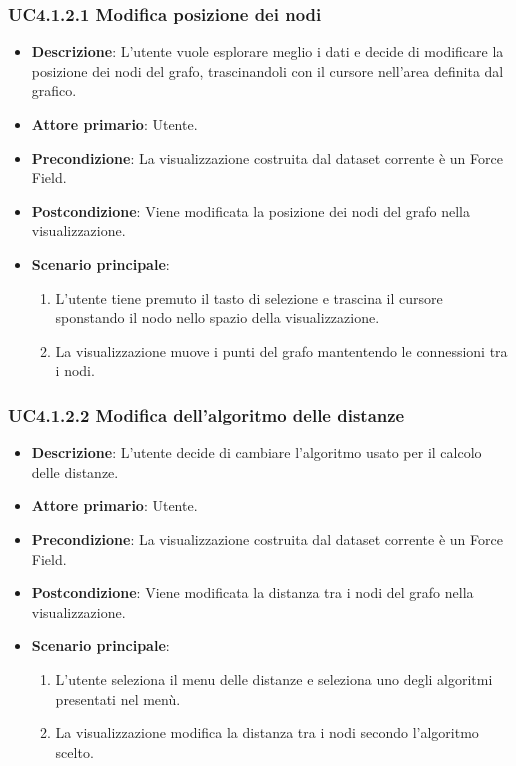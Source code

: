 \subsubsection{UC4.1.2.1 Modifica posizione dei nodi}
\label{subsec:uc4.1.2.1}
\begin{itemize}
    \item \textbf{Descrizione}: L’utente vuole esplorare meglio i dati e decide di 
                                modificare la posizione dei nodi del grafo, trascinandoli con il 
                                cursore nell'area definita dal grafico.
	
    \item \textbf{Attore primario}: Utente.
    
    \item \textbf{Precondizione}:   La visualizzazione costruita dal dataset corrente è un Force Field.
    \item \textbf{Postcondizione}:  Viene modificata la posizione dei nodi del grafo nella visualizzazione.

	\item \textbf{Scenario principale}:
        \begin{enumerate}
            \item L'utente tiene premuto il tasto di selezione e trascina il cursore sponstando il nodo nello spazio della visualizzazione.
            \item La visualizzazione muove i punti del grafo mantentendo le connessioni tra i nodi.
        \end{enumerate}
\end{itemize}

\subsubsection{UC4.1.2.2 Modifica dell'algoritmo delle distanze}
\label{subsec:uc4.1.2.2}
\begin{itemize}
    \item \textbf{Descrizione}: L’utente decide di cambiare l’algoritmo usato per il calcolo delle distanze.

	
    \item \textbf{Attore primario}: Utente.
    
    \item \textbf{Precondizione}:   La visualizzazione costruita dal dataset corrente è un Force Field.
    \item \textbf{Postcondizione}:  Viene modificata la distanza tra i nodi del grafo nella visualizzazione.

	\item \textbf{Scenario principale}:
        \begin{enumerate}
            \item L'utente seleziona il menu delle distanze e seleziona uno degli algoritmi presentati nel menù.
            \item La visualizzazione modifica la distanza tra i nodi secondo l'algoritmo scelto.
        \end{enumerate}
\end{itemize}

